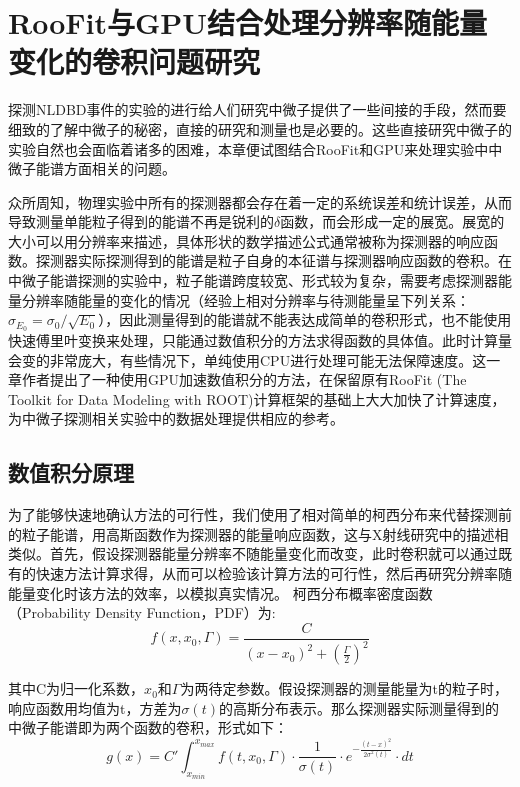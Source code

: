 \chapter{RooFit与GPU结合处理分辨率随能量变化的卷积问题研究}

探测NLDBD事件的实验的进行给人们研究中微子提供了一些间接的手段，然而要细致的了解中微子的秘密，直接的研究和测量也是必要的。这些直接研究中微子的实验自然也会面临着诸多的困难，本章便试图结合RooFit和GPU来处理实验中中微子能谱方面相关的问题。

众所周知，物理实验中所有的探测器都会存在着一定的系统误差和统计误差，从而导致测量单能粒子得到的能谱不再是锐利的$\delta$函数，而会形成一定的展宽。展宽的大小可以用分辨率来描述，具体形状的数学描述公式通常被称为探测器的响应函数。探测器实际探测得到的能谱是粒子自身的本征谱与探测器响应函数的卷积。在中微子能谱探测的实验中，粒子能谱跨度较宽、形式较为复杂\supercite{qian2015neutrino}，需要考虑探测器能量分辨率随能量的变化的情况（经验上相对分辨率与待测能量呈下列关系：$\sigma_{E_0}=\sigma_0/\sqrt{E_0}$）\supercite{leo2012techniques}，因此测量得到的能谱就不能表达成简单的卷积形式，也不能使用快速傅里叶变换来处理\supercite{mathworld}，只能通过数值积分的方法求得函数的具体值。此时计算量会变的非常庞大，有些情况下，单纯使用CPU进行处理可能无法保障速度。这一章作者提出了一种使用GPU加速数值积分的方法，在保留原有RooFit (The Toolkit for Data Modeling with ROOT)\supercite{roofit}计算框架的基础上大大加快了计算速度，为中微子探测相关实验中的数据处理提供相应的参考。

\section{数值积分原理}

为了能够快速地确认方法的可行性，我们使用了相对简单的柯西分布来代替探测前的粒子能谱，用高斯函数作为探测器的能量响应函数，这与X射线研究中的描述相类似\supercite{wang2006cmga}。首先，假设探测器能量分辨率不随能量变化而改变，此时卷积就可以通过既有的快速方法计算求得，从而可以检验该计算方法的可行性，然后再研究分辨率随能量变化时该方法的效率，以模拟真实情况。
柯西分布概率密度函数（Probability Density Function，PDF）为:
\begin{equation}
    f(x,x_0,\Gamma)=\frac{C}{(x-x_0)^2+(\frac{\Gamma}{2})^2}
\end{equation}

其中C为归一化系数，$x_0$和$\Gamma$为两待定参数。假设探测器的测量能量为t的粒子时，响应函数用均值为t，方差为$\sigma(t)$的高斯分布表示。那么探测器实际测量得到的中微子能谱即为两个函数的卷积，形式如下：
\begin{equation}
    g(x)=C'\int_{x_{min}}^{x_{max}}f(t,x_0,\Gamma)\cdot\frac{1}{\sigma(t)}\cdot e^{-\frac{(t-x)^2}{2\sigma^2(t)}}\cdot dt 
\end{equation}

